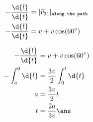 \documentclass{article}
\begin{document}
\begin{align*}
-\dfrac{\d{l}}{\d{t}} &= | \vec{v}_{31} |_{\texttt{along the path}}\\
-\dfrac{\d{l}}{\d{t}} &= v+v\cos(60^\circ)
\end{align*}
\pagebreak

\addtolength{\jot}{3ex}
\begin{align*}
-\dfrac{\d{l}}{\d{t}} &= v+v\cos(60^\circ)\\
-\int_a^0 \d{l} &= \dfrac{3v}{2}\int_0^t \d{t}\\
a &= \dfrac{3v}{2} t\\
t &= \dfrac{2a}{3v} \ans
\end{align*}

\pagebreak
\vspace*{\fill}
\begin{center}
	\fbox{\qrcode[height=2cm]{\gdrive}}
\end{center}
\vspace*{\fill}
\end{document}
